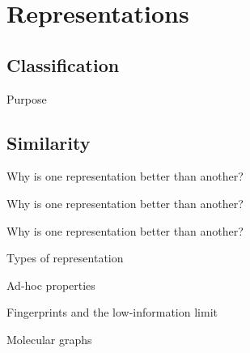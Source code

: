
\section{Representations}
\subsection{Classification}
\begin{frame}[t]{Purpose}

\end{frame}
\subsection{Similarity}
\begin{frame}[t]{Why is one representation better than another?}

\end{frame}
\begin{frame}[t]{Why is one representation better than another?}

\end{frame}
\begin{frame}[t]{Why is one representation better than another?}

\end{frame}
\begin{frame}[t]{Types of representation}

\end{frame}
\begin{frame}[t]{Ad-hoc properties}

\end{frame}
\begin{frame}[t]{Fingerprints and the low-information limit}

\end{frame}
\begin{frame}[t]{Molecular graphs}

\end{frame}

